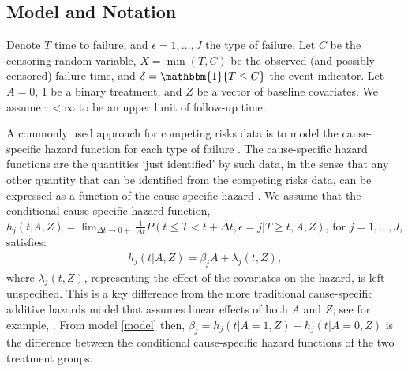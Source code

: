 \documentclass[11pt]{article}
\newcommand{\ee}{\end{eqnarray}}
\newcommand{\be}{\begin{eqnarray}}
\begin{document}
 \newtheorem{theorem}{Theorem}
 \newtheorem{lemma}{Lemma}
  \newtheorem{assumption}{Assumption}


\subsection{Model and Notation}
\label{s:model}

Denote $T$ %
time to failure, and  $\epsilon=1,\ldots,J$  the type of failure. Let
 $C$ be the censoring random variable,   $X=\min(T,C)$ be the observed (and possibly censored) failure time, and $\delta=\mathbbm{1}\{T \leq C\}$  the event indicator. 
 Let $A= 0$, 1 be a binary treatment, and $Z$ be a vector of baseline covariates. 
 We assume $\tau<\infty$ to be an upper limit of follow-up time.
 
 A commonly used approach for competing risks data is to model the cause-specific hazard function for each type of failure \citep{holt1978competing, %
 kalbfleisch2011statistical}. 
The cause-specific hazard functions are the quantities `just identified' by such data, in the sense that any other quantity that can be identified from the competing risks data, can be expressed as a function of the cause-specific hazard \citep{kalbfleisch2011statistical}.
 We assume that the conditional cause-specific hazard function, $h_j(t | A, Z)=\lim_{\Delta t \rightarrow 0+ }\frac{1}{\Delta t}P(t\leq T < t+\Delta t, \epsilon=j | T\geq t, A, Z)$,
  for $j=1,\ldots,J$, 
 satisfies:  
\be\label{model}
h_j(t | A, Z)= \beta_j A + \lambda_{j}(t , Z), 
\ee
where $\lambda_{j}(t , Z)$, representing the effect of the covariates on the hazard, is left unspecified.
This %
is a key difference from the more traditional cause-specific additive hazards model that assumes linear effects of  both $A$ and $Z$; see for example, \cite{shen1999confidence}. 
From model \eqref{model} then, 
$
\beta_j= h_j(t | A=1, Z)- h_j(t | A=0, Z)
$
is the difference between the conditional cause-specific hazard functions of the two treatment groups.
\end{document}
